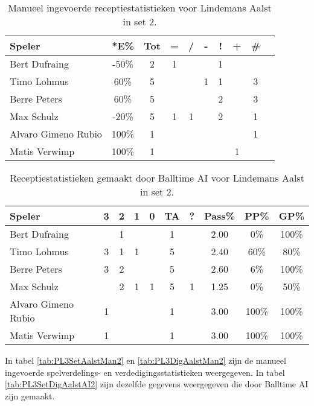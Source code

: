 \begin{table}[ht!]
    \centering
    \scriptsize
    \begin{tabular}{|l|c|c|c|c|c|c|c|c|c|}
        \hline
        \textbf{Speler} & *E\% & Tot & = & / & - & ! & + & \# \\ \hline
        Bert Dufraing & -50\% & 2 & 1 &  & & 1 &  &  \\ 
        Timo Lohmus & 60\% & 5 &  &  & 1 & 1 & & 3 \\ 
        Berre Peters & 60\% & 5 &  &  &  & 2 & & 3 \\ 
        Max Schulz & -20\% & 5 & 1 & 1 & & 2 &  & 1 \\
        Alvaro Gimeno Rubio & 100\% & 1 &  &  &  & &  & 1 \\ 
        Matis Verwimp & 100\% & 1 & & & & & 1 &  \\ \hline
    \end{tabular}
  \caption[Manueel ingevoerde receptiestatistieken voor Lindemans Aalst in set 2]{\label{tab:PL3ReceiveAalstMan2}Manueel ingevoerde receptiestatistieken voor Lindemans Aalst in set 2.}
\end{table}

\begin{table}[ht!]
  \centering
  \scriptsize
  \begin{tabular}{|l|c|c|c|c|c|c|c|c|c|} \hline
    \textbf{Speler} & 3 & 2 & 1 & 0 & TA & ? & Pass\% & PP\% & GP\% \\ \hline
    Bert Dufraing &  &  1 &  &  & 1 &  & 2.00 & 0\% & 100\% \\
    Timo Lohmus & 3 & 1 & 1 &   & 5 &  & 2.40 & 60\% & 80\% \\
    Berre Peters & 3 & 2 &   &  & 5 &  & 2.60 & 6\% & 100\% \\
    Max Schulz &   & 2 & 1 & 1 & 5 & 1 & 1.25 & 0\% & 50\%  \\
    Alvaro Gimeno Rubio & 1 &   &   &  & 1 &  & 3.00 & 100\% & 100\% \\
    Matis Verwimp & 1 &   &   &  & 1 &  & 3.00 & 100\% & 100\% \\ \hline
  \end{tabular}
  \caption[Receptiestatistieken gemaakt door Balltime AI voor Lindemans Aalst in set 2]{\label{tab:PL3ReceiveAalstAI2}Receptiestatistieken gemaakt door Balltime AI voor Lindemans Aalst in set 2.}
\end{table}

In tabel \ref{tab:PL3SetAalstMan2} en \ref{tab:PL3DigAalstMan2} zijn de manueel ingevoerde spelverdelings- en verdedigingsstatistieken weergegeven. In tabel \ref{tab:PL3SetDigAalstAI2} zijn dezelfde gegevens weergegeven die door Balltime AI zijn gemaakt.

